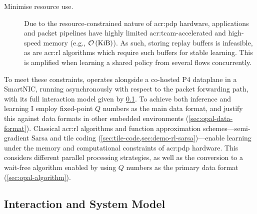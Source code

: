 \begin{description}
	\item[Minimise resource use.] Due to the resource-constrained nature of \gls{acr:pdp} hardware, applications and packet pipelines have highly limited \gls{acr:tcam}-accelerated and high-speed memory (e.g., $\mathcal{O}\left(\unit{\kibi\byte}\right)$). As such, storing replay buffers is infeasible, as are \gls{acr:rl} algorithms which require such buffers for stable learning. This is amplified when learning a shared policy from several flows concurrently.
	
%	
\end{description}

To meet these constraints, \approachshort{} operates alongside a co-hosted P4 dataplane in a SmartNIC, running asynchronously with respect to the packet forwarding path, with its full interaction model given by \cref{sec:opal-sys-model}.
To achieve both inference and learning I employ fixed-point $Q$ numbers as the main data format, and justify this against data formats in other embedded environments (\cref{sec:opal-data-format}).
Classical \gls{acr:rl} algorithms and function approximation schemes---semi-gradient Sarsa and tile coding (\cref{sec:tile-code,sec:demo-rl-sarsa})---enable learning under the memory and computational constraints of \gls{acr:pdp} hardware. This considers different parallel processing strategies, as well as the conversion to a wait-free algorithm enabled by using $Q$ numbers as the primary data format (\cref{sec:opal-algorithm}).

\subsection{Interaction and System Model}\label{sec:opal-sys-model}

